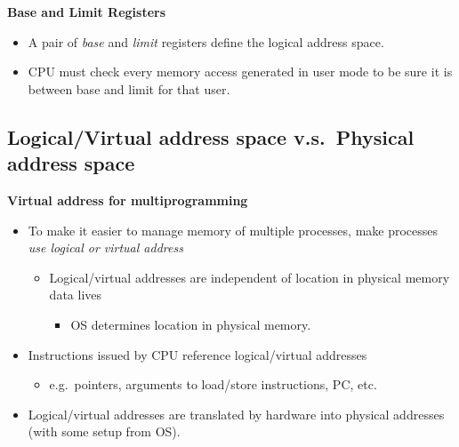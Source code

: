 \documentclass[11pt,a4paper]{article}
\begin{document}
\textbf{Base and Limit Registers}
\begin{itemize}
    \item A pair of \emph{base} and \emph{limit} registers define the logical address
        space.
    \item CPU must check every memory access generated in user mode to be sure it is
        between base and limit for that user.
\end{itemize}

\subsection{Logical/Virtual address space v.s.\ Physical address space}

\textbf{Virtual address for multiprogramming}
\begin{itemize}
    \item To make it easier to manage memory of multiple processes,
        make processes \emph{use logical or virtual address}
        \begin{itemize}
            \item Logical/virtual addresses are independent of location in physical
                memory data lives
                \begin{itemize}
                    \item OS determines location in physical memory.
                \end{itemize}
        \end{itemize}
    \item Instructions issued by CPU reference logical/virtual addresses
        \begin{itemize}
            \item e.g.\ pointers, arguments to load/store instructions, PC, etc.
        \end{itemize}
    \item Logical/virtual addresses are translated by hardware into physical addresses
        (with some setup from OS).
\end{itemize}
\end{document}
